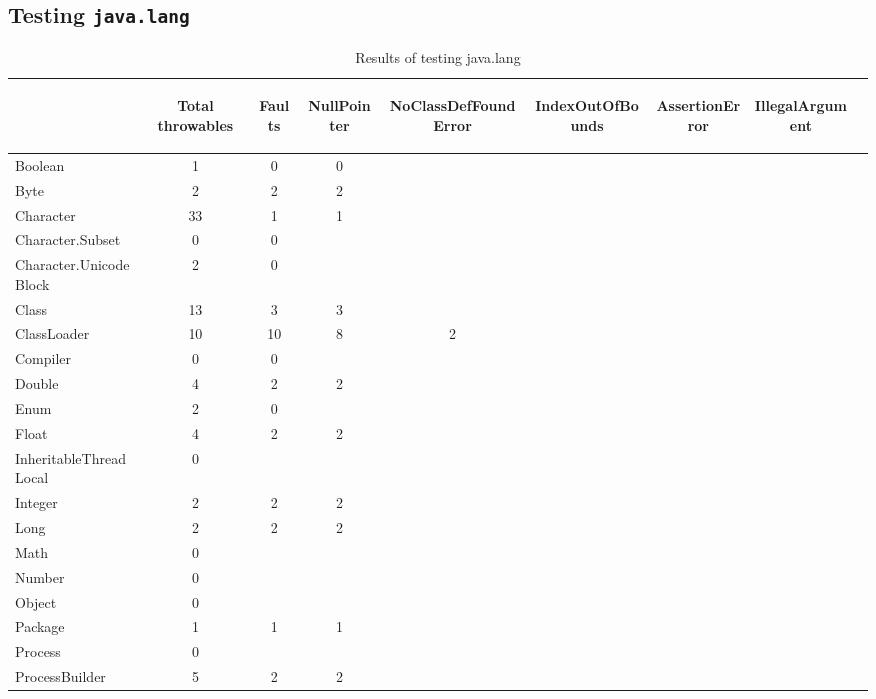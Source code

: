 \subsection{Testing \texttt{java.lang}}

\begin{table}[h!]
\caption{Results of testing java.lang}\label{tab:javalang}
\begin{center}
\begin{tabular}{l c c c c c c c c}
\hline
&\begin{sideways}Total throwables\end{sideways}&\begin{sideways}Faults\end{sideways}&\begin{sideways}NullPointer\end{sideways}&\begin{sideways}NoClassDefFoundError\end{sideways}&\begin{sideways}IndexOutOfBounds\end{sideways}&\begin{sideways}AssertionError\end{sideways}&\begin{sideways}IllegalArgument\end{sideways}\\
\hline
Boolean &1&0&0&&&&\\
Byte &2&2&2&&&&\\
Character &33&1&1&&&&\\
Character.Subset &0&0&&&&&\\
Character.UnicodeBlock &2&0&&&&&\\
Class &13&3&3&&&&\\
ClassLoader &10&10&8&2&&&\\
Compiler &0&0&&&&&\\
Double &4&2&2&&&&\\
Enum &2&0&&&&&\\
Float &4&2&2&&&&\\
InheritableThreadLocal &0&&&&&&\\
Integer &2&2&2&&&&\\
Long &2&2&2&&&&\\
Math &0&&&&&&\\
Number &0&&&&&&\\
Object &0&&&&&&\\
Package &1&1&1&&&&\\
Process &0&&&&&&\\
ProcessBuilder &5&2&2&&&&\\

\end{tabular}
\end{center}
\end{table}
